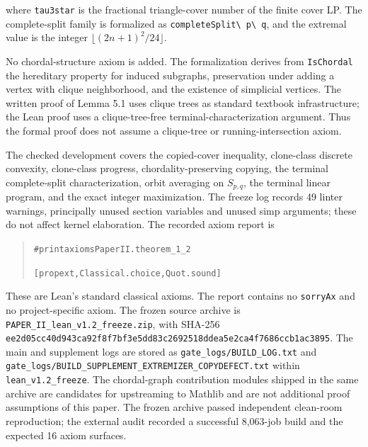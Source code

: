 \documentclass[english,11pt,a4paper]{article}
\begin{document}
where \nolinkurl{tau3star} is the fractional triangle-cover number of the
finite cover LP. The complete-split family is formalized as
\nolinkurl{completeSplit\ p\ q}, and the extremal value is the integer
\(\lfloor(2n+1)^2/24\rfloor\).

No chordal-structure axiom is added. The formalization derives from
\nolinkurl{IsChordal} the hereditary property for induced subgraphs,
preservation under adding a vertex with clique neighborhood, and the
existence of simplicial vertices. The written proof of Lemma 5.1 uses
clique trees as standard textbook infrastructure; the Lean proof uses a
clique-tree-free terminal-characterization argument. Thus the formal
proof does not assume a clique-tree or running-intersection axiom.

The checked development covers the copied-cover inequality, clone-class
discrete convexity, clone-class progress, chordality-preserving copying,
the terminal complete-split characterization, orbit averaging on
\(S_{p,q}\), the terminal linear program, and the exact integer
maximization. The freeze log records 49 linter warnings, principally
unused section variables and unused simp arguments; these do not affect
kernel elaboration. The recorded axiom report is

\begin{quote}
{\LeanSymbols\fontsize{8}{10}\selectfont
\noindent \nolinkurl{#print}\hspace{0.45em}\nolinkurl{axioms}\hspace{0.45em}\nolinkurl{PaperII.theorem_1_2}\par
\noindent \nolinkurl{[propext,}\hspace{0.45em}\nolinkurl{Classical.choice,}\hspace{0.45em}\nolinkurl{Quot.sound]}\par
}
\end{quote}

These are Lean's standard classical axioms. The report contains no
\nolinkurl{sorryAx} and no project-specific axiom. The frozen source
archive is \nolinkurl{PAPER_II_lean_v1.2_freeze.zip}, with SHA-256
\nolinkurl{ee2d05cc40d943ca92f8f7bf3e5dd83c2692518ddea5e2ca4f7686ccb1ac3895}.
The main and supplement logs are stored as
\nolinkurl{gate_logs/BUILD_LOG.txt} and
\nolinkurl{gate_logs/BUILD_SUPPLEMENT_EXTREMIZER_COPYDEFECT.txt} within
\nolinkurl{lean_v1.2_freeze}. The chordal-graph contribution modules
shipped in the same archive are candidates for upstreaming to Mathlib
and are not additional proof assumptions of this paper. The frozen
archive passed independent clean-room reproduction; the external audit
recorded a successful 8,063-job build and the expected 16 axiom
surfaces.
\end{document}
